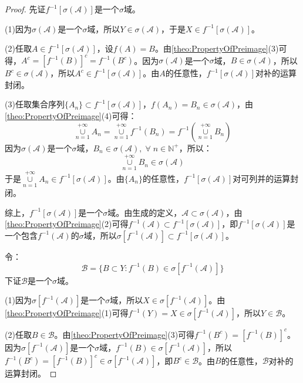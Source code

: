 \begin{proof}
	先证$f^{-1}[\sigma(\mathscr{A})]$是一个$\sigma$域。\par
	(1)因为$\sigma(\mathscr{A})$是一个$\sigma$域，所以$Y\in\sigma(\mathscr{A})$，于是$X\in f^{-1}[\sigma(\mathscr{A})]$。\par
	(2)任取$A\in f^{-1}[\sigma(\mathscr{A})]$，设$f(A)=B$。由\cref{theo:PropertyOfPreimage}(3)可得，$A^c=[f^{-1}(B)]^c=f^{-1}(B^c)$。因为$\sigma(\mathscr{A})$是一个$\sigma$域，$B\in\sigma(\mathscr{A})$，所以$B^c\in\sigma(\mathscr{A})$，所以$A^c\in f^{-1}[\sigma(\mathscr{A})]$。由$A$的任意性，$f^{-1}[\sigma(\mathscr{A})]$对补的运算封闭。\par
	(3)任取集合序列$\{A_n\}\subset f^{-1}[\sigma(\mathscr{A})]$，$f(A_n)=B_n\in\sigma(\mathscr{A})$，由\cref{theo:PropertyOfPreimage}(4)可得：
	\begin{equation*}
		\underset{n=1}{\overset{+\infty}{\cup}}A_n=\underset{n=1}{\overset{+\infty}{\cup}}f^{-1}(B_n)=f^{-1}\left(\underset{n=1}{\overset{+\infty}{\cup}}B_n\right)
	\end{equation*}
	因为$\sigma(\mathscr{A})$是一个$\sigma$域，$B_n\in\sigma(\mathscr{A}),\;\forall\;n\in\mathbb{N}^+$，所以：
	\begin{equation*}
		\underset{n=1}{\overset{+\infty}{\cup}}B_n\in\sigma(\mathscr{A})
	\end{equation*}
	于是$\underset{n=1}{\overset{+\infty}{\cup}}A_n\in f^{-1}[\sigma(\mathscr{A})]$。由$\{A_n\}$的任意性，$f^{-1}[\sigma(\mathscr{A})]$对可列并的运算封闭。\par
	综上，$f^{-1}[\sigma(\mathscr{A})]$是一个$\sigma$域。由生成的定义，$\mathscr{A}\subset\sigma(\mathscr{A})$，由\cref{theo:PropertyOfPreimage}(2)可得$f^{-1}(\mathscr{A})\subset f^{-1}[\sigma(\mathscr{A})]$，即$f^{-1}[\sigma(\mathscr{A})]$是一个包含$f^{-1}(\mathscr{A})$的$\sigma$域，所以$\sigma[f^{-1}(\mathscr{A})]\subset f^{-1}[\sigma(\mathscr{A})]$。\par
	令：
	\begin{equation*}
		\mathscr{B}=\{B\subset Y:f^{-1}(B)\in \sigma[f^{-1}(\mathscr{A})]\}
	\end{equation*}
	下证$\mathscr{B}$是一个$\sigma$域。\par
	(1)因为$\sigma[f^{-1}(\mathscr{A})]$是一个$\sigma$域，所以$X\in\sigma[f^{-1}(\mathscr{A})]$。由\cref{theo:PropertyOfPreimage}(1)可得$f^{-1}(Y)=X\in\sigma[f^{-1}(\mathscr{A})]$，所以$Y\in\mathscr{B}$。\par
	(2)任取$B\in\mathscr{B}$。由\cref{theo:PropertyOfPreimage}(3)可得$f^{-1}(B^c)=[f^{-1}(B)]^c$。因为$\sigma[f^{-1}(\mathscr{A})]$是一个$\sigma$域，$f^{-1}(B)\in\sigma[f^{-1}(\mathscr{A})]$，所以$f^{-1}(B^c)=[f^{-1}(B)]^c\in\sigma[f^{-1}(\mathscr{A})]$，即$B^c\in\mathscr{B}$。由$B$的任意性，$\mathscr{B}$对补的运算封闭。\par

\end{proof}
